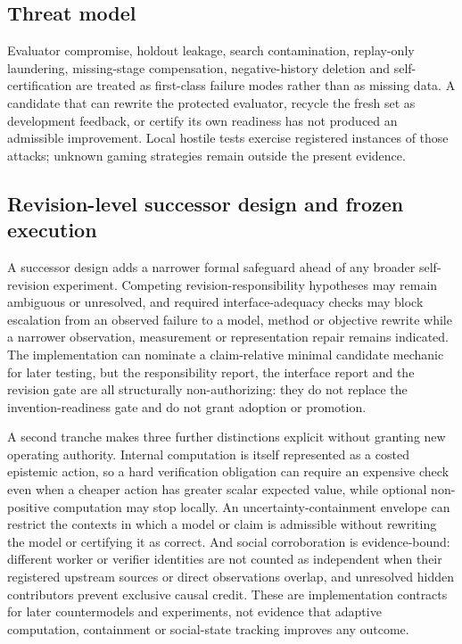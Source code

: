 \subsection{Threat model}

Evaluator compromise, holdout leakage, search contamination, replay-only laundering, missing-stage compensation, negative-history deletion and self-certification are treated as first-class failure modes rather than as missing data. A candidate that can rewrite the protected evaluator, recycle the fresh set as development feedback, or certify its own readiness has not produced an admissible improvement. Local hostile tests exercise registered instances of those attacks; unknown gaming strategies remain outside the present evidence.

\subsection{Revision-level successor design and frozen execution}

A successor design adds a narrower formal safeguard ahead of any broader self-revision experiment. Competing revision-responsibility hypotheses may remain ambiguous or unresolved, and required interface-adequacy checks may block escalation from an observed failure to a model, method or objective rewrite while a narrower observation, measurement or representation repair remains indicated. The implementation can nominate a claim-relative minimal candidate mechanic for later testing, but the responsibility report, the interface report and the revision gate are all structurally non-authorizing: they do not replace the invention-readiness gate and do not grant adoption or promotion.

A second tranche makes three further distinctions explicit without granting new operating authority. Internal computation is itself represented as a costed epistemic action, so a hard verification obligation can require an expensive check even when a cheaper action has greater scalar expected value, while optional non-positive computation may stop locally. An uncertainty-containment envelope can restrict the contexts in which a model or claim is admissible without rewriting the model or certifying it as correct. And social corroboration is evidence-bound: different worker or verifier identities are not counted as independent when their registered upstream sources or direct observations overlap, and unresolved hidden contributors prevent exclusive causal credit. These are implementation contracts for later countermodels and experiments, not evidence that adaptive computation, containment or social-state tracking improves any outcome.

